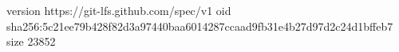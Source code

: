 version https://git-lfs.github.com/spec/v1
oid sha256:5c21ee79b428f82d3a97440baa6014287ccaad9fb31e4b27d97d2c24d1bffeb7
size 23852
